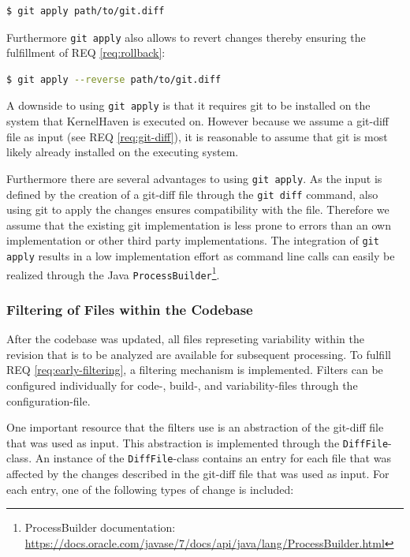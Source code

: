 \documentclass[a4paper]{article}
\begin{document}
\begin{lstlisting}[language=bash]
  $ git apply path/to/git.diff
\end{lstlisting}

 Furthermore \texttt{git apply} also allows to revert changes thereby ensuring the fulfillment of REQ \ref{req:rollback}:
 \begin{lstlisting}[language=bash]
  $ git apply --reverse path/to/git.diff
\end{lstlisting}
 
 A downside to using \texttt{git apply} is that it requires git to be installed on the system that KernelHaven is executed on. However because we assume a git-diff file as input (see REQ \ref{req:git-diff}), it is reasonable to assume that git is most likely already installed on the executing system.

Furthermore there are several advantages to using \texttt{git apply}. As the input is defined by the creation of a git-diff file through the \texttt{git diff} command, also using git to apply the changes ensures compatibility with the file. Therefore we assume that the existing git implementation is less prone to errors than an own implementation or other third party implementations. The integration of \texttt{git apply} results in a low implementation effort as command line calls can easily be realized through the Java \texttt{ProcessBuilder}\footnote{ProcessBuilder documentation: \url{https://docs.oracle.com/javase/7/docs/api/java/lang/ProcessBuilder.html}}.

\subsubsection{Filtering of Files within the Codebase}\label{filtering-input}

After the codebase was updated, all files represeting variability within the revision that is to be analyzed are available for subsequent processing. To fulfill REQ \ref{req:early-filtering}, a filtering mechanism is implemented. Filters can be configured individually for code-, build-, and variability-files through the configuration-file.

One important resource that the filters use is an abstraction of the git-diff file that was used as input. This abstraction is implemented through the \texttt{DiffFile}-class.
An instance of the \texttt{DiffFile}-class contains an entry for each file that was affected by the changes described in the git-diff file that was used as input. For each entry, one of the following types of change is included:
\end{document}
